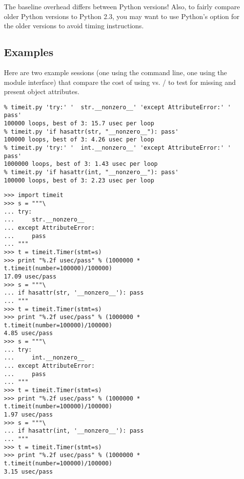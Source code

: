 The baseline overhead differs between Python versions!  Also, to
fairly compare older Python versions to Python 2.3, you may want to
use Python's  option for the older versions to avoid
timing  instructions.

\subsection{Examples}

Here are two example sessions (one using the command line, one using
the module interface) that compare the cost of using
 vs. / to test for
missing and present object attributes.

\begin{verbatim}
% timeit.py 'try:' '  str.__nonzero__' 'except AttributeError:' '  pass'
100000 loops, best of 3: 15.7 usec per loop
% timeit.py 'if hasattr(str, "__nonzero__"): pass'
100000 loops, best of 3: 4.26 usec per loop
% timeit.py 'try:' '  int.__nonzero__' 'except AttributeError:' '  pass'
1000000 loops, best of 3: 1.43 usec per loop
% timeit.py 'if hasattr(int, "__nonzero__"): pass'
100000 loops, best of 3: 2.23 usec per loop
\end{verbatim}

\begin{verbatim}
>>> import timeit
>>> s = """\
... try:
...     str.__nonzero__
... except AttributeError:
...     pass
... """
>>> t = timeit.Timer(stmt=s)
>>> print "%.2f usec/pass" % (1000000 * t.timeit(number=100000)/100000)
17.09 usec/pass
>>> s = """\
... if hasattr(str, '__nonzero__'): pass
... """
>>> t = timeit.Timer(stmt=s)
>>> print "%.2f usec/pass" % (1000000 * t.timeit(number=100000)/100000)
4.85 usec/pass
>>> s = """\
... try:
...     int.__nonzero__
... except AttributeError:
...     pass
... """
>>> t = timeit.Timer(stmt=s)
>>> print "%.2f usec/pass" % (1000000 * t.timeit(number=100000)/100000)
1.97 usec/pass
>>> s = """\
... if hasattr(int, '__nonzero__'): pass
... """
>>> t = timeit.Timer(stmt=s)
>>> print "%.2f usec/pass" % (1000000 * t.timeit(number=100000)/100000)
3.15 usec/pass
\end{verbatim}
